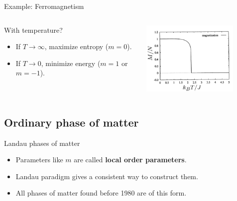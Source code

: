 \documentclass{beamer}
\begin{document}
\begin{frame}{Example: Ferromagnetism}
	\begin{columns}
		\begin{column}{0.5\textwidth}
			With temperature?
			\begin{itemize}
				\item If $T\rightarrow\infty$, maximize entropy ($m=0$).
				\item If $T\rightarrow 0$, minimize energy ($m=1$ or $m=-1$).
			\end{itemize}
		\end{column}
		\begin{column}{0.5\textwidth}
			\begin{center}
				\includegraphics[width=0.8\textwidth]{Images/IsingPhaseTransition.png}
			\end{center}
		\end{column}
	\end{columns}
\end{frame}

\subsection{Ordinary phase of matter}

\begin{frame}{Landau phases of matter}
	\begin{itemize}
		\item Parameters like $m$ are called \textbf{local order parameters}.
		\item Landau paradigm gives a consistent way to construct them.
		\item All phases of matter found before 1980 are of this form.
	\end{itemize}
\end{frame}
\end{document}
